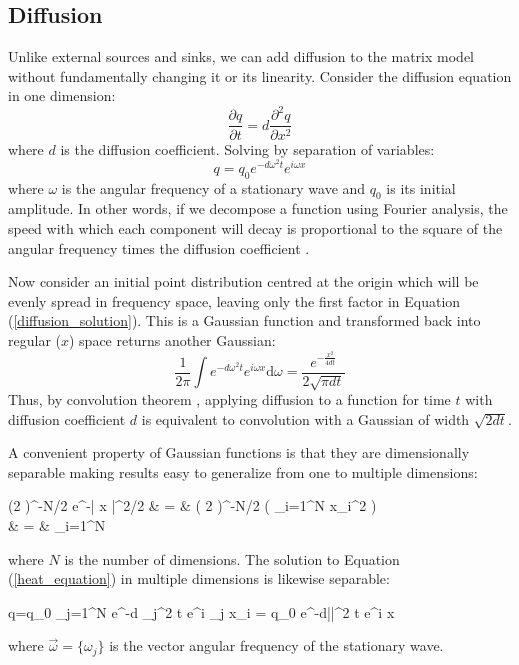 \subsection{Diffusion}

Unlike external sources and sinks, we can add diffusion to the matrix model 
without fundamentally changing it or its linearity. 
Consider the diffusion equation in one dimension:
\begin{equation}
  \frac{\partial q}{\partial t}=d \frac{\partial^2 q}{\partial x^2}
  \label{heat_equation}
\end{equation}
where $d$ is the diffusion coefficient.
Solving by separation of variables:
\begin{equation}
  q=q_0 e^{-d \omega^2 t} e^{i \omega x}
  \label{diffusion_solution}
\end{equation}
where $\omega$ is the angular frequency of a stationary wave
and $q_0$ is its initial amplitude.
In other words, if we decompose a function using Fourier analysis, the speed
with which each component will decay is proportional to the square of the
angular frequency times the diffusion coefficient \citep{Cannon1984}.

Now consider an initial point distribution centred at the origin 
which will be evenly spread
in frequency space, leaving only the first factor in 
Equation (\ref{diffusion_solution}). 
This is a Gaussian function and transformed
back into regular ($x$) space returns another Gaussian:
\begin{equation}
	\frac{1}{2 \pi} \int e^{-d \omega^2 t} e^{i \omega x} \mathrm d \omega = \frac{e^{-\frac{x^2}{4 d t}}}{2 \sqrt{\pi d t}}
	\label{Gaussian_diffusion}
\end{equation}
Thus, by convolution theorem \citep{Katznelson1976}, 
applying diffusion to a function for time $t$ 
with diffusion coefficient $d$ 
is equivalent to convolution with a Gaussian of width $\sqrt{2 d t}$.

A convenient property of Gaussian functions 
is that they are dimensionally separable
making results easy to generalize from one to multiple dimensions:
\begin{eqanl}
	\left (2 \pi \right )^{-N/2} e^{-| \vec x |^2/2} 
	& = & \left ( 2 \pi \right )^{-N/2} \exp \left (  \sum_{i=1}^N x_i^2 \right ) \\
	& = & \prod_{i=1}^N 
\end{eqanl}
where $N$ is the number of dimensions.
The solution to Equation (\ref{heat_equation}) in multiple dimensions is likewise
separable:
\begin{eqnl}
	q=q_0 \prod_{j=1}^N e^{-d \omega_j^2 t} e^{i \omega_j x_i} = q_0 e^{-d|\vec \omega|^2 t} e^{i \vec \omega \cdot \vec x}
\end{eqnl}
where $\vec \omega=\lbrace \omega_j \rbrace$ is the vector angular frequency
of the stationary wave.

